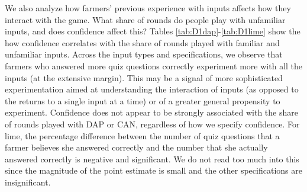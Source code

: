 \documentclass[12pt,letterpaper]{article}
\begin{document}
We also analyze how farmers' previous experience with inputs affects how they interact with the game. What share of rounds do people play with unfamiliar inputs, and does confidence affect this? Tables \ref{tab:D1dap}-\ref{tab:D1lime} show the how confidence correlates with the share of rounds played with familiar and unfamiliar inputs. Across the input types and specifications, we observe that farmers who answered more quiz questions correctly experiment more with all the inputs (at the extensive margin). This may be a signal of more sophisticated experimentation aimed at understanding the interaction of inputs (as opposed to the returns to a single input at a time) or of a greater general propensity to experiment. Confidence does not appear to be strongly associated with the share of rounds played with DAP or CAN, regardless of how we specify confidence. For lime, the percentage difference between the number of quiz questions that a farmer believes she answered correctly and the number that she actually answered correctly is negative and significant. We do not read too much into this since the magnitude of the point estimate is small and the other specifications are insignificant. 








% 

\clearpage
\end{document}
